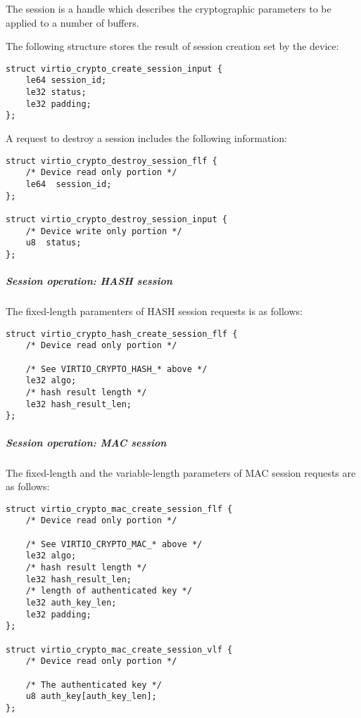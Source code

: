 The session is a handle which describes the cryptographic parameters to be
applied to a number of buffers.

The following structure stores the result of session creation set by the device:

\begin{lstlisting}
struct virtio_crypto_create_session_input {
    le64 session_id;
    le32 status;
    le32 padding;
};
\end{lstlisting}

A request to destroy a session includes the following information:

\begin{lstlisting}
struct virtio_crypto_destroy_session_flf {
    /* Device read only portion */
    le64  session_id;
};

struct virtio_crypto_destroy_session_input {
    /* Device write only portion */
    u8  status;
};
\end{lstlisting}


\subparagraph{Session operation: HASH session}\label{sec:Device Types / Crypto Device / Device
Operation / Control Virtqueue / Session operation / Session operation: HASH session}

The fixed-length paramenters of HASH session requests is as follows:

\begin{lstlisting}
struct virtio_crypto_hash_create_session_flf {
    /* Device read only portion */

    /* See VIRTIO_CRYPTO_HASH_* above */
    le32 algo;
    /* hash result length */
    le32 hash_result_len;
};
\end{lstlisting}


\subparagraph{Session operation: MAC session}\label{sec:Device Types / Crypto Device / Device
Operation / Control Virtqueue / Session operation / Session operation: MAC session}

The fixed-length and the variable-length parameters of MAC session requests are as follows:

\begin{lstlisting}
struct virtio_crypto_mac_create_session_flf {
    /* Device read only portion */

    /* See VIRTIO_CRYPTO_MAC_* above */
    le32 algo;
    /* hash result length */
    le32 hash_result_len;
    /* length of authenticated key */
    le32 auth_key_len;
    le32 padding;
};

struct virtio_crypto_mac_create_session_vlf {
    /* Device read only portion */

    /* The authenticated key */
    u8 auth_key[auth_key_len];
};
\end{lstlisting}

